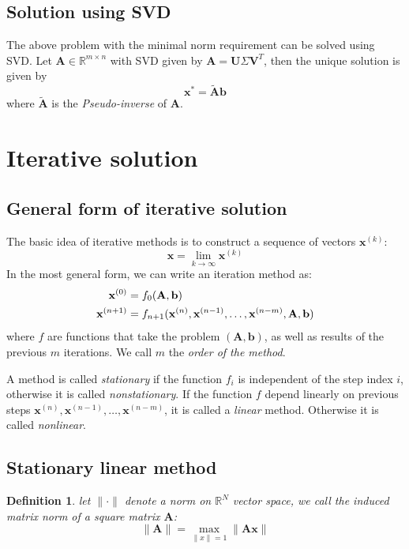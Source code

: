 \documentclass{article}
\newtheorem*{definition}{Definition}
\begin{document}
\subsection{Solution using SVD}
The above problem with the minimal norm requirement can be solved using SVD.
Let $\mathbf{A}\in \mathbb{R}^{m\times n}$ with SVD given by 
$\mathbf{A} = \mathbf{U}\Sigma \mathbf{V}^T$, then the unique solution is 
given by
\begin{equation}
    \mathbf{x}^* = \tilde{\mathbf{A}} \mathbf{b}
\end{equation}
where $\tilde{\mathbf{A}}$ is the \emph{Pseudo-inverse} of $\mathbf{A}$.



\newpage
\section{Iterative solution}
\subsection{General form of iterative solution}
The basic idea of iterative methods is to construct a sequence of vectors 
$\mathbf{x}^{(k)}$:
\begin{equation*}
    \mathbf{x} = \lim_{k\to \infty} \mathbf{x}^{(k)}
\end{equation*}
In the most general form, we can write an iteration method as:
\begin{align}
    \mathbf{x}^{(0)} &= f_0(\mathbf{A}, \mathbf{b}) \notag \\
    \mathbf{x}^{(n+1)} &= f_{n+1}(\mathbf{x}^{(n)}, \mathbf{x}^{(n-1)}, \dots,  
    \mathbf{x}^{(n-m)}, \mathbf{A}, \mathbf{b})
\end{align}
where $f$ are functions that take the problem $(\mathbf{A}, \mathbf{b})$, as well as results of the previous 
$m$ iterations. We call $m$ the \emph{order of the method}. 

A method is called \emph{stationary} if the function $f_i$ is independent of the step index $i$, 
otherwise it is called \emph{nonstationary}. If the function $f$ depend linearly on previous steps 
$\mathbf{x}^{(n)}, \mathbf{x}^{(n-1)}, \dots,  \mathbf{x}^{(n-m)}$, it is called a 
\emph{linear} method. Otherwise it is called \emph{nonlinear}. 

\subsection{Stationary linear method}
\begin{definition}
let $\|\cdot\|$ denote a norm on $\mathbb{R}^N$ vector space,
we call the induced matrix 
norm of a square matrix $\mathbf{A}$:
\begin{equation*}
    \|\mathbf{A}\|=\max_{\|x\|=1} \|\mathbf{A}\mathbf{x}\|
\end{equation*}
\end{definition}
\end{document}
